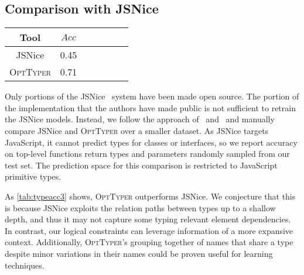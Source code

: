 \documentclass[acmsmall,nonacm]{acmart}\settopmatter{printfolios=true,printccs=false,printacmref=false}
\newcommand{\projectname}{\textsc{OptTyper}\xspace}
\begin{document}

\subsection{Comparison with JSNice}
\begin{table*}[t]
	\centering
	\caption{Accuracy for JSNice and OptTyper; on 107 annotations slots.}
		\label{tab:typeacc3}
	\begin{tabular}{ccccccc}
		\toprule
		Tool   & $Acc$ \\
		\midrule
		JSNice     & 0.45\\
		\projectname & 0.71\\
		\bottomrule
	\end{tabular}
\end{table*}

Only portions of the JSNice~\cite{raychev15} system have been made open source. 
The portion of the implementation that the authors have made public is not sufficient to retrain the JSNice models. 
Instead, we follow the approach of~\citet{hellendoorn18} and~\citet{wei20} and manually compare JSNice and \projectname over a smaller dataset. 
As JSNice targets JavaScript, it cannot predict types for classes or interfaces, so we report accuracy on top-level functions return types and parameters randomly sampled from our test set. The prediction
space for this comparison is restricted to JavaScript primitive types.

As \cref{tab:typeacc3} shows, \projectname outperforms JSNice. We conjecture that this is because JSNice exploits the relation paths between types up to a shallow depth, and thus it may not
capture some typing relevant element dependencies. 
In contrast, our logical constraints can leverage information of a more expansive context.
Additionally, \projectname's grouping together of names that share a type despite minor variations in their names could be proven useful for learning techniques.

\end{document}
